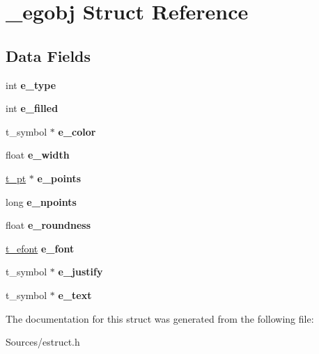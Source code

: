 \hypertarget{struct__egobj}{\section{\-\_\-egobj Struct Reference}
\label{struct__egobj}
}
\subsection*{Data Fields}
\begin{DoxyCompactItemize}
\item 
\hypertarget{struct__egobj_a18c9e48ccb18cdbc171c5fc149536e7b}{int {\bfseries e\-\_\-type}}\label{struct__egobj_a18c9e48ccb18cdbc171c5fc149536e7b}

\item 
\hypertarget{struct__egobj_ae13e50cb319a060b3e612c39d0fc698d}{int {\bfseries e\-\_\-filled}}\label{struct__egobj_ae13e50cb319a060b3e612c39d0fc698d}

\item 
\hypertarget{struct__egobj_a13dfb00aea95e0dc5b9d1297260a9280}{t\-\_\-symbol $\ast$ {\bfseries e\-\_\-color}}\label{struct__egobj_a13dfb00aea95e0dc5b9d1297260a9280}

\item 
\hypertarget{struct__egobj_abe0dac7e3167ea1dd6c4e238ab4ab8bd}{float {\bfseries e\-\_\-width}}\label{struct__egobj_abe0dac7e3167ea1dd6c4e238ab4ab8bd}

\item 
\hypertarget{struct__egobj_a579eafd42827c9bdcddc613774309ad3}{\hyperlink{struct__pt}{t\-\_\-pt} $\ast$ {\bfseries e\-\_\-points}}\label{struct__egobj_a579eafd42827c9bdcddc613774309ad3}

\item 
\hypertarget{struct__egobj_a216eff6ab0216b35e215bd1c1b8fb0d0}{long {\bfseries e\-\_\-npoints}}\label{struct__egobj_a216eff6ab0216b35e215bd1c1b8fb0d0}

\item 
\hypertarget{struct__egobj_ab2c5a6f93a125c4862295e28aad05a74}{float {\bfseries e\-\_\-roundness}}\label{struct__egobj_ab2c5a6f93a125c4862295e28aad05a74}

\item 
\hypertarget{struct__egobj_a4bf02b4e1a6c0c7723b5ed198f45e0b0}{\hyperlink{struct__efont}{t\-\_\-efont} {\bfseries e\-\_\-font}}\label{struct__egobj_a4bf02b4e1a6c0c7723b5ed198f45e0b0}

\item 
\hypertarget{struct__egobj_a41dc1b542ee19a3171a52480dff2c664}{t\-\_\-symbol $\ast$ {\bfseries e\-\_\-justify}}\label{struct__egobj_a41dc1b542ee19a3171a52480dff2c664}

\item 
\hypertarget{struct__egobj_a5f97b246c0da885ff0cd44b32a967338}{t\-\_\-symbol $\ast$ {\bfseries e\-\_\-text}}\label{struct__egobj_a5f97b246c0da885ff0cd44b32a967338}

\end{DoxyCompactItemize}


The documentation for this struct was generated from the following file\-:\begin{DoxyCompactItemize}
\item 
Sources/estruct.\-h\end{DoxyCompactItemize}
